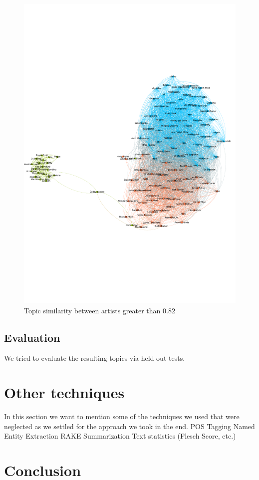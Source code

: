 \documentclass[10pt,a4paper]{article}
\begin{document}
		\begin{figure}[htb]
			\centering
			\includegraphics[trim=0mm 70mm 0mm 50mm, clip, width=\linewidth]{data/topic_similarity}
				\caption{Topic similarity between artists greater than $0.82$}
				\label{fig:topicsimilarity}
		\end{figure}
		
		\subsection{Evaluation}
		We tried to evaluate the resulting topics via held-out tests.
	
	\section{Other techniques}
	\label{sec:othertechniques}
	In this section we want to mention some of the techniques we used that were neglected as we settled for the approach we took in the end.
	POS Tagging
	Named Entity Extraction
	RAKE
	Summarization
	Text statistics (Flesch Score, etc.)

	\section{Conclusion}
	\label{sec:conclusion}
	
	\newpage
	
	
	
	
\end{document}
